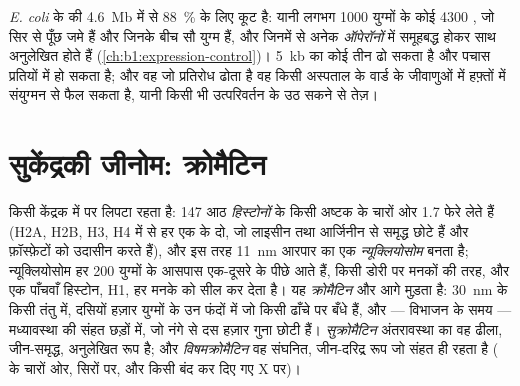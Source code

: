 \begin{example}[एक सघन जीनोम]\label{ex:b1:genomes:dense}
\emph{E. coli} के  की \qty{4.6}{Mb} में से \qty{88}{\%}
 के लिए कूट है: यानी लगभग \num{1000} युग्मों के कोई \num{4300}
, जो सिर से पूँछ जमे हैं और जिनके बीच सौ युग्म हैं, और जिनमें से अनेक
\emph{ऑपेरॉनों} में समूहबद्ध होकर साथ अनुलेखित होते हैं (\cref{ch:b1:expression-control})।
\qty{5}{kb} का कोई  तीन  ढो सकता है और पचास
प्रतियों में हो सकता है; और वह जो प्रतिरोध  ढोता है वह किसी अस्पताल के
वार्ड के जीवाणुओं में हफ़्तों में संयुग्मन से फैल सकता है, यानी किसी भी
उत्परिवर्तन के उठ सकने से तेज़।
\end{example}

\section{सुकेंद्रकी जीनोम: क्रोमैटिन}

\begin{definition}[न्यूक्लियोसोम, क्रोमैटिन]\label{def:b1:genomes:nucleosome}
किसी  केंद्रक में   पर लिपटा रहता है: \qty{147}{}
 आठ \emph{हिस्टोनों} के किसी अष्टक के चारों ओर 1.7 फेरे लेते
हैं (H2A, H2B, H3, H4 में से हर एक के दो, जो लाइसीन तथा
आर्जिनीन से समृद्ध छोटे  हैं और फ़ॉस्फ़ेटों को उदासीन करते हैं),
और इस तरह \qty{11}{nm} आरपार का एक
\emph{न्यूक्लियोसोम} बनता है; न्यूक्लियोसोम
हर \qty{200}{} युग्मों के आसपास एक-दूसरे के पीछे आते हैं, किसी डोरी पर
मनकों की तरह, और एक पाँचवाँ हिस्टोन, H1, हर मनके को सील कर देता है। यह
\emph{क्रोमैटिन} और आगे मुड़ता है: \qty{30}{nm} के किसी तंतु में, दसियों
हज़ार युग्मों के उन फंदों में जो किसी  ढाँचे पर बँधे हैं,
और --- विभाजन के समय --- मध्यावस्था  की संहत छड़ों में, जो नंगे
 से दस हज़ार गुना छोटी हैं।
\emph{सुक्रोमैटिन} अंतरावस्था का वह ढीला, जीन-समृद्ध, अनुलेखित रूप है;
और \emph{विषमक्रोमैटिन} वह संघनित, जीन-दरिद्र रूप जो संहत ही रहता है
( के चारों ओर, सिरों पर, और किसी बंद कर दिए गए
X  पर)।
\end{definition}

